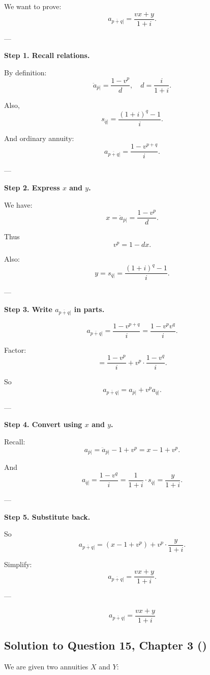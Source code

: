 \documentclass[12pt, a4paper]{article}
\begin{document}
We want to prove:
\[
a_{\overline{p+q}|} = \frac{v x + y}{1+i}.
\]

---

\textbf{Step 1. Recall relations.}

By definition:
\[
\ddot{a}_{\overline{p}|} = \frac{1-v^p}{d}, 
\quad d = \frac{i}{1+i}.
\]

Also,
\[
s_{\overline{q}|} = \frac{(1+i)^q - 1}{i}.
\]

And ordinary annuity:
\[
a_{\overline{p+q}|} = \frac{1-v^{p+q}}{i}.
\]

---

\textbf{Step 2. Express $x$ and $y$.}

We have:
\[
x = \ddot{a}_{\overline{p}|} = \frac{1-v^p}{d}.
\]

Thus
\[
v^p = 1 - dx.
\]

Also:
\[
y = s_{\overline{q}|} = \frac{(1+i)^q - 1}{i}.
\]

---

\textbf{Step 3. Write $a_{\overline{p+q}|}$ in parts.}

\[
a_{\overline{p+q}|} = \frac{1-v^{p+q}}{i} 
= \frac{1-v^p v^q}{i}.
\]

Factor:
\[
= \frac{1-v^p}{i} + v^p \cdot \frac{1-v^q}{i}.
\]

So
\[
a_{\overline{p+q}|} = a_{\overline{p}|} + v^p a_{\overline{q}|}.
\]

---

\textbf{Step 4. Convert using $x$ and $y$.}

Recall:
\[
a_{\overline{p}|} = \ddot{a}_{\overline{p}|} - 1 + v^p = x - 1 + v^p.
\]

And
\[
a_{\overline{q}|} = \frac{1-v^q}{i} = \frac{1}{1+i} \cdot s_{\overline{q}|} = \frac{y}{1+i}.
\]

---

\textbf{Step 5. Substitute back.}

So
\[
a_{\overline{p+q}|} = (x - 1 + v^p) + v^p \cdot \frac{y}{1+i}.
\]

Simplify:
\[
a_{\overline{p+q}|} = \frac{vx + y}{1+i}.
\]

---

\[
\boxed{a_{\overline{p+q}|} = \frac{vx + y}{1+i}}
\]


\subsection*{Solution to Question 15, Chapter 3 (\cite{toi3rd})}

We are given two annuities $X$ and $Y$:
\end{document}
